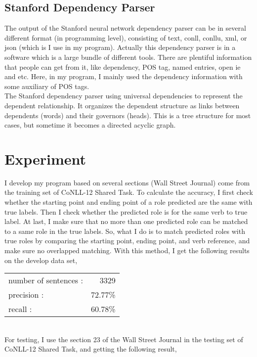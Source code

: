 \documentclass[letterpaper]{article}
\begin{document}
\subsection{Stanford Dependency Parser}

The output of the Stanford neural network dependency parser can be in several different format (in programming level), consisting of text, conll, conllu, xml, or json (which is I use in my program). Actually this dependency parser is in a software which is a large bundle of different tools. There are plentiful information that people can get from it, like dependency, POS tag, named entries, open ie and etc. Here, in my program, I mainly used the dependency information with some auxiliary of POS tags.\\

The Stanford dependency parser using universal dependencies to represent the dependent relationship. It organizes the dependent structure as links between dependents (words) and their governors (heads). This is a tree structure for most cases, but sometime it becomes a directed acyclic graph.\\



\section{Experiment}
I develop my program based on several sections (Wall Street Journal) come from the training set of CoNLL-12 Shared Task. To calculate the accuracy, I first check whether the starting point and ending point of a role predicted are the same with true labels. Then I check whether the predicted role is for the same verb to true label. At last, I make sure that no more than one predicted role can be matched to a same role in the true labels. So, what I do is to match predicted roles with true roles by comparing the starting point, ending point, and verb reference, and make sure no overlapped matching. With this method, I get the following results on the develop data set, \\

\begin{tabular}{l r}
number of sentences :	& 3329 \\
precision : 			& 72.77\% \\
recall : 				& 60.78\% \\
\end{tabular}\\


For testing, I use the section 23 of the Wall Street Journal in the testing set of CoNLL-12 Shared Task, and getting the following result, \\
\end{document}
